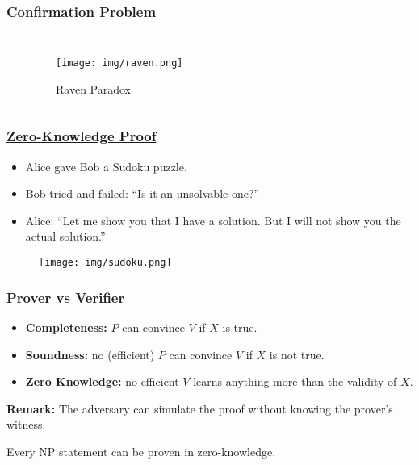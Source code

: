 \documentclass[UTF8,aspectratio=43,11pt,colorlinks,compress,openany]{beamer}%
\begin{document}
\begin{frame}\frametitle{Confirmation Problem}
\begin{columns}
	\begin{prooftree}
		\noLine
		\alwaysSingleLine
	\end{prooftree}
	\begin{figure}
		\texttt{[image: img/raven.png]}\caption{Raven Paradox}
	\end{figure}
\end{columns}
\end{frame}

\begin{frame}\frametitle{\href{https://zhuanlan.zhihu.com/p/34072069}{Zero-Knowledge Proof}}
	\begin{itemize}
		\item Alice gave Bob a Sudoku puzzle.
		\item Bob tried and failed: ``Is it an unsolvable one?''
		\item Alice: ``Let me show you that I have a solution. But I will not show you the actual solution.''
	\end{itemize}
\begin{figure}
\texttt{[image: img/sudoku.png]}
\end{figure}
\end{frame}

\begin{frame}\frametitle{Prover vs Verifier}
	\begin{itemize}
		\item \textbf{Completeness:} $P$ can convince $V$ if $X$ is true.
		\item \textbf{Soundness:} no (efficient) $P$ can convince $V$ if $X$ is not true.
		\item \textbf{Zero Knowledge:} no efficient $V$ learns anything more than the validity of $X$.
	\end{itemize}
	\textbf{Remark:} The adversary can simulate the proof without knowing the prover's witness.
	\begin{theorem}
		Every NP statement can be proven in zero-knowledge.
	\end{theorem}
\end{frame}
\end{document}
